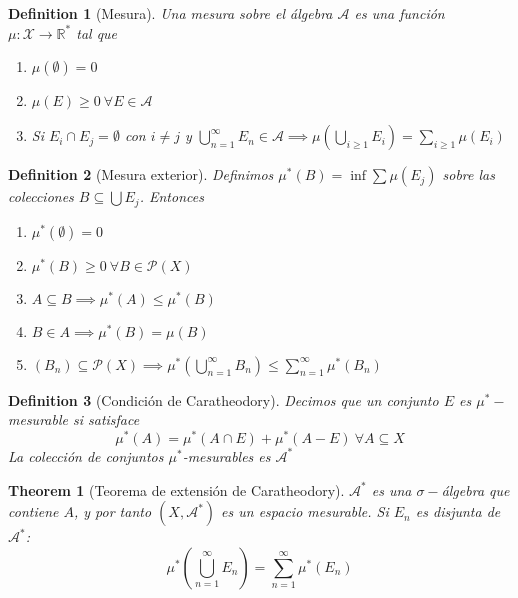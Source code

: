 \documentclass{myclass}
\newtheorem*{definition}{Definition}
\newtheorem*{theorem}{Theorem}
\begin{document}
\begin{definition}[Mesura] Una mesura sobre el álgebra $\mathcal{A}$ es una función $\mu : \mathcal{X}\to \mathbb{R}^*$ tal que
  \begin{enumerate}[topsep=-6pt, itemsep=0pt]
    \item $\mu(\emptyset) = 0$
	\item  $\mu(E)\ge 0 \ \forall E \in \mathcal{A}$ 
	\item Si $E_i \cap E_j = \emptyset$ con $i\neq j$ y $\bigcup_{n=1}^\infty E_n\in \mathcal{A} \implies \displaystyle \mu\left( \bigcup_{i\ge 1} E_i \right) = \sum_{i\ge 1}\mu(E_{i})  $
  \end{enumerate}
\end{definition}

\begin{definition}[Mesura exterior]
Definimos $\displaystyle \mu^*(B) = \inf \sum\mu(E_j)$ sobre las colecciones $B\subseteq \bigcup E_j$. Entonces 
\begin{enumerate}[topsep=-6pt, itemsep=0pt]
  \item $\mu^*(\emptyset) = 0$
  \item $\mu^*(B)\ge 0 \ \forall B\in \mathcal{P}(X)$
  \item $A\subseteq B \implies \mu^*(A) \le \mu^* (B)$
  \item $B\in A \implies \mu^*(B) = \mu(B)$
  \item $(B_n)\subseteq \mathcal{P}(X) \implies \displaystyle \mu^* \left( \bigcup_{n=1}^\infty B_n \right) \le \sum_{n=1}^\infty \mu^*(B_n) $
\end{enumerate}
\end{definition}

\begin{definition}[Condición de Caratheodory] Decimos que un conjunto $E$ es $\mu^*-$mesurable si satisface
\[
\mu^*(A) = \mu^*(A \cap E) + \mu^*(A-E) \ \forall A\subseteq X
\] 
La colección de conjuntos $\mu^*$-mesurables es $\mathcal{A}^*$
\end{definition}

\begin{theorem}[Teorema de extensión de Caratheodory]
$\mathcal{A}^*$ es una $\sigma-$álgebra que contiene $A$, y por tanto  $(X, \mathcal{A}^*)$ es un espacio mesurable. Si $E_n$ es disjunta de  $\mathcal{A}^*$:
\[
\mu^*\left( \bigcup_{n=1}^\infty E_n \right) = \sum_{n=1}^\infty \mu^*(E_n)
\] 

\end{theorem}
\end{document}
